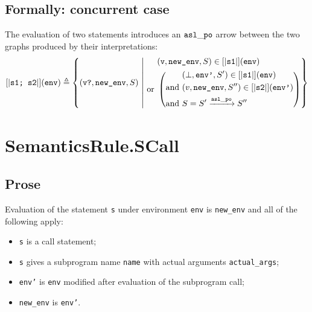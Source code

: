 \documentclass{book}
\begin{document}
\begin{formal}
  \subsection{Formally: concurrent case}
  The evaluation of two statements introduces an $\mathtt{asl\_po}$ arrow between the two
graphs produced by their interpretations:
  \begin{align}
    \left[| \texttt{s1; s2} \right|] (\texttt{env}) \triangleq
      \left\{ (\texttt{v?}, \texttt{new\_env}, S) \ \middle|\ {}
      \begin{aligned}
        & (\texttt{v}, \texttt{new\_env}, S) \in \left[| \texttt{s1} \right|] (\texttt{env})
        \\ \text{or}\ &
        \left(
        \begin{aligned}
            & (\bot{}, \texttt{env'}, S') \in \left[| \texttt{s1} \right|] (\texttt{env})
            \\ \text{and}\ &
            (v, \texttt{new\_env}, S'') \in \left[| \texttt{s2} \right|] (\texttt{env'})
            \\ \text{and}\ &
            S = S' \xrightarrow{\mathtt{asl\_po}} S''
        \end{aligned}
        \right)
      \end{aligned}
      \right\}
    \label{eq:sem-conc-sseq}
  \end{align}
\end{formal}


\section{SemanticsRule.SCall \label{sec:SemanticsRule.SCall}}

    \subsection{Prose}
  Evaluation of the statement \texttt{s} under environment \texttt{env} is
\texttt{new\_env} and all of the following apply:
    \begin{itemize}
    \item \texttt{s} is a call statement;
    \item \texttt{s} gives a subprogram name \texttt{name} with actual arguments \texttt{actual\_args};
    \item \texttt{env'} is \texttt{env} modified after evaluation of the subprogram call;
    \item \texttt{new\_env} is \texttt{env'}.
    \end{itemize}
\end{document}
